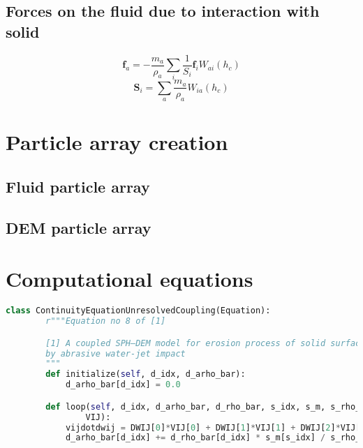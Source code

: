\documentclass[preprint,12pt]{elsarticle}
\newcommand{\ten}[1]{\ensuremath{\mathbf{#1}}}
\begin{document}
\subsection{Forces on the fluid due to interaction with solid}
\label{sec:coupling-force-on-fluid}


\begin{equation}
\ten{f}_a = -\frac{m_a}{\rho_a} \sum_i \frac{1}{S_i} \ten{f}_i W_{ai}(h_c)
\end{equation}
\begin{equation}
\ten{S}_i = \sum_a \frac{m_a}{\rho_a} W_{ia}(h_c)
\end{equation}



\FloatBarrier%
\section{Particle array creation}
\label{sec:particle-array-creation}


\FloatBarrier%
\subsection{Fluid particle array}
\label{sec:}


\FloatBarrier%
\subsection{DEM particle array}
\label{sec:}



\FloatBarrier%
\section{Computational equations}
\label{sec:computational-equations}

\begin{lstlisting}[label={contact:equations},frame=lines,language=Python,upquote=True]
    class ContinuityEquationUnresolvedCoupling(Equation):
        r"""Equation no 8 of [1]

        [1] A coupled SPH–DEM model for erosion process of solid surface
        by abrasive water-jet impact
        """
        def initialize(self, d_idx, d_arho_bar):
            d_arho_bar[d_idx] = 0.0

        def loop(self, d_idx, d_arho_bar, d_rho_bar, s_idx, s_m, s_rho_bar, DWIJ,
                VIJ):
            vijdotdwij = DWIJ[0]*VIJ[0] + DWIJ[1]*VIJ[1] + DWIJ[2]*VIJ[2]
            d_arho_bar[d_idx] += d_rho_bar[d_idx] * s_m[s_idx] / s_rho_bar[s_idx] * vijdotdwij


\end{lstlisting}
\end{document}

